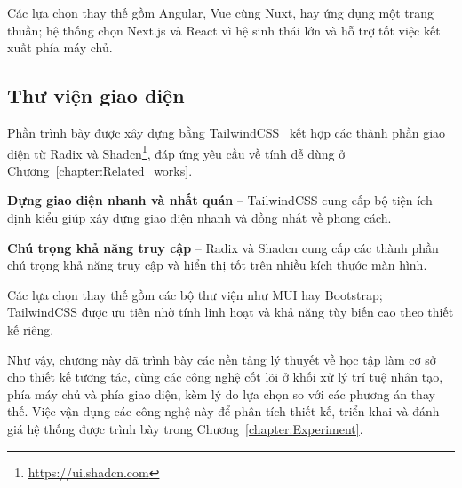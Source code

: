\documentclass[../DoAn.tex]{subfiles}
\begin{document}
Các lựa chọn thay thế gồm Angular, Vue cùng Nuxt, hay ứng dụng một trang thuần; hệ thống chọn Next.js và React vì hệ sinh thái lớn và hỗ trợ tốt việc kết xuất phía máy chủ.

\subsection{Thư viện giao diện}
Phần trình bày được xây dựng bằng TailwindCSS~\cite{tailwindcss} kết hợp các thành phần giao diện từ Radix và Shadcn\footnote{\url{https://ui.shadcn.com}}, đáp ứng yêu cầu về tính dễ dùng ở Chương~\ref{chapter:Related_works}.

\textbf{Dựng giao diện nhanh và nhất quán} -- TailwindCSS cung cấp bộ tiện ích định kiểu giúp xây dựng giao diện nhanh và đồng nhất về phong cách.

\textbf{Chú trọng khả năng truy cập} -- Radix và Shadcn cung cấp các thành phần chú trọng khả năng truy cập và hiển thị tốt trên nhiều kích thước màn hình.

Các lựa chọn thay thế gồm các bộ thư viện như MUI hay Bootstrap; TailwindCSS được ưu tiên nhờ tính linh hoạt và khả năng tùy biến cao theo thiết kế riêng.

Như vậy, chương này đã trình bày các nền tảng lý thuyết về học tập làm cơ sở cho thiết kế tương tác, cùng các công nghệ cốt lõi ở khối xử lý trí tuệ nhân tạo, phía máy chủ và phía giao diện, kèm lý do lựa chọn so với các phương án thay thế. Việc vận dụng các công nghệ này để phân tích thiết kế, triển khai và đánh giá hệ thống được trình bày trong Chương~\ref{chapter:Experiment}.
\end{document}
